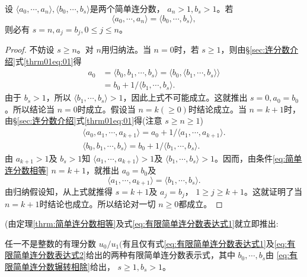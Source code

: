 \begin{theorem}\label{thrm:简单连分数相等}
	设 	\( \langle a_0, \cdots, a_n \rangle, \langle b_0, \cdots, b_s \rangle \)是两个简单连分数， \( a_n > 1, b_s > 1
	\)。若
	\begin{equation}
		\langle a_0, \cdots, a_n \rangle = \langle b_0, \cdots, b_s \rangle,
		\label{eq:简单连分数相等}
	\end{equation}
	则必有 \( s = n, a_j = b_j, 0 \leqslant j \leqslant n \)。
\end{theorem}
\begin{proof}
	不妨设 \( s \geqslant n \)。对 \( n \)用归纳法。当 \( n=0 \)时，若 \( s \geqslant 1
	\)，则由\S\ref{sec:连分数介绍}式\eqref{thrm01eq:01}得
	\begin{align*}
		a_0 & = \langle b_0, b_1, \cdots, b_s \rangle = \langle b_0, \langle b_1, \cdots, b_s \rangle \rangle \\
		    & = b_0 + 1 / \langle b_1, \cdots, b_s \rangle.
	\end{align*}
	由于 \( b_s > 1 \)，所以 \( \langle b_1, \cdots, b_s \rangle > 1\)，因此上式不可能成立。这就推出 \( s=0, a_0=b_0
	\)。所以结论当 \( n=0 \)时成立。假设当 \( n=k(\geqslant 0) \)时结论成立。当 \( n=k+1
	\)时，由\S\ref{sec:连分数介绍}式\eqref{thrm01eq:01}得(注意 \( s \geqslant n \geqslant 1 \))
	\begin{gather*}
		\langle a_0, a_1, \cdots, a_{k+1}\rangle = a_0 + 1/ \langle a_1, \cdots, a_{k+1} \rangle. \\
		\langle b_0, b_1, \cdots, b_s \rangle = b_0 + 1/ \langle b_1, \cdots, b_s \rangle.
	\end{gather*}
	由 \( a_{k+1} > 1 \)及 \( b_s > 1 \)知 \( \langle a_1, \cdots, a_{k+1} \rangle > 1 \)及 \( \langle b_1, \cdots, b_s
	\rangle > 1 \)。因而，由条件\eqref{eq:简单连分数相等} \(  n=k+1  \)，就推出 \( a_0 = b_0 \)及
	\begin{equation*}
		\langle a_1, \cdots, a_{k+1} \rangle = \langle b_1, \cdots, b_s \rangle.
	\end{equation*}
	由归纳假设知，从上式就推得 \( s = k + 1 \)及 \( a_j = b_j \)， \( 1 \geqslant j \geqslant k + 1 \)。这就证明了当 \(
	n = k + 1\)时结论也成立。所以结论对一切 \( n \geqslant 0 \)都成立。
\end{proof}

(由定理\ref{thrm:简单连分数相等}及式\eqref{eq:有限简单连分数表达式1}就立即推出:
\begin{theorem}
	任一不是整数的有理分数 \( u_0 / u_1 (\)有且仅有式\eqref{eq:有限简单连分数表达式1}及\eqref{eq:有限简单连分数表达式2}给出的两种有限简单连分数表示式，其中 \( b_0, \cdots, b_s
	\)由 \eqref{eq:有限简单连分数辗转相除}给出， \( s \geqslant 1, b_s > 1 \)。
\end{theorem}

